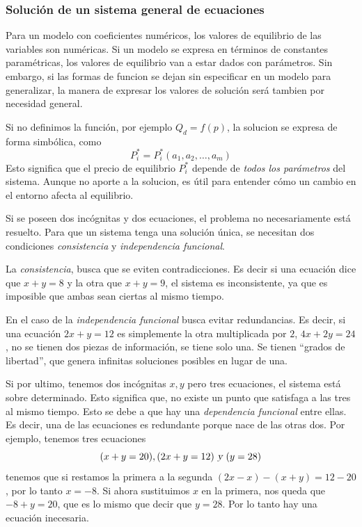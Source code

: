 \subsubsection{Solución de un sistema general de ecuaciones}

Para un modelo con coeficientes numéricos, los valores de equilibrio de las variables son numéricas. Si un modelo se expresa en términos de constantes paramétricas, los valores de equilibrio van a estar dados con parámetros. Sin embargo, si las formas de funcion se dejan sin especificar en un modelo para generalizar, la manera de expresar los valores de solución será tambien por necesidad general.

Si no definimos la función, por ejemplo \(Q_d = f(p)\), la solucion se expresa de forma simbólica, como 
\[
P_i^\ast=P_i^\ast(a_1,a_2,\dots,a_m)
\]
Esto significa que el precio de equilibrio \(P_i^\ast\) depende de \textit{todos los parámetros} del sistema. Aunque no aporte a la solucion, es útil para entender cómo un cambio en el entorno afecta al equilibrio.

Si se poseen dos incógnitas y dos ecuaciones, el problema no necesariamente está resuelto. Para que un sistema tenga una solución única, se necesitan dos condiciones \textit{consistencia} y \textit{independencia funcional}.

La \textit{consistencia}, busca que se eviten contradicciones. Es decir si una ecuación dice que \(x+y=8\) y la otra que \(x+y=9\), el sistema es inconsistente, ya que es imposible que ambas sean ciertas al mismo tiempo.

En el caso de la \textit{independencia funcional} busca evitar redundancias. Es decir, si una ecuación \(2x+y = 12\) es simplemente la otra multiplicada por \(2\), \(4x+2y=24\), no se tienen dos piezas de información, se tiene solo una. Se tienen ``grados de libertad'', que genera infinitas soluciones posibles en lugar de una.

Si por ultimo, tenemos dos incógnitas \(x,y\) pero tres ecuaciones, el sistema está sobre determinado. Esto significa que, no existe un punto que satisfaga a las tres al mismo tiempo. Esto se debe a que hay una \textit{dependencia funcional} entre ellas. Es decir, una de las ecuaciones es redundante porque nace de las otras dos. Por ejemplo, tenemos tres ecuaciones 
\[
(x+y=20), (2x+y=12) \textsl{ y } (y=28)
\]
tenemos que si restamos la primera a la segunda \((2x-x)-(x+y)=12-20\), por lo tanto \(x=-8\). Si ahora sustituimos \(x\) en la primera, nos queda que \(-8+y=20\), que es lo mismo que decir que \(y=28\). Por lo tanto hay una ecuación inecesaria.

